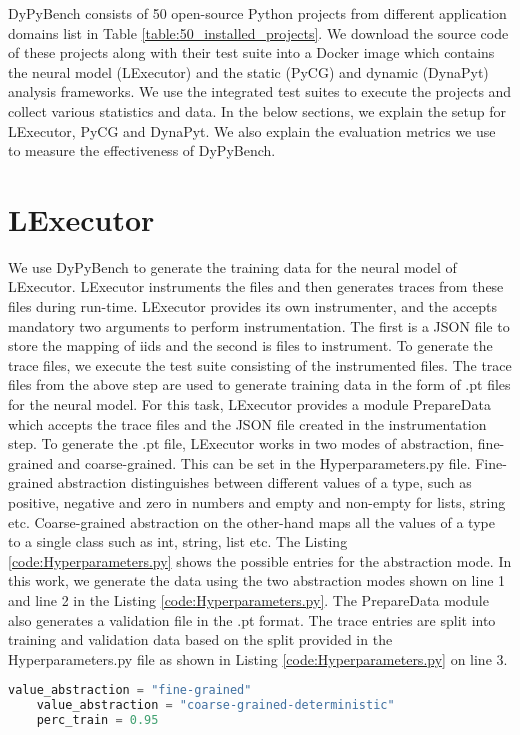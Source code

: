DyPyBench consists of 50 open-source Python projects from different application domains list in Table \ref{table:50_installed_projects}.
We download the source code of these projects along with their test suite into a Docker image which contains the neural model (LExecutor) and the static (PyCG) and dynamic (DynaPyt) analysis frameworks.
We use the integrated test suites to execute the projects and collect various statistics and data.
In the below sections, we explain the setup for LExecutor, PyCG and DynaPyt.
We also explain the evaluation metrics we use to measure the effectiveness of DyPyBench.

\section{LExecutor}
We use DyPyBench to generate the training data for the neural model of LExecutor.
LExecutor instruments the files and then generates traces from these files during run-time.
LExecutor provides its own instrumenter, and the accepts mandatory two arguments to perform instrumentation.
The first is a JSON file to store the mapping of iids and the second is files to instrument.
To generate the trace files, we execute the test suite consisting of the instrumented files.
The trace files from the above step are used to generate training data in the form of .pt files for the neural model.
For this task, LExecutor provides a module PrepareData which accepts the trace files and the JSON file created in the instrumentation step.
To generate the .pt file, LExecutor works in two modes of abstraction, fine-grained and coarse-grained.
This can be set in the Hyperparameters.py file.
Fine-grained abstraction distinguishes between different values of a type, such as positive, negative and zero in numbers and empty and non-empty for lists, string etc.
Coarse-grained abstraction on the other-hand maps all the values of a type to a single class such as int, string, list etc. \cite{LExecutor_2023}
The Listing \ref{code:Hyperparameters.py} shows the possible entries for the abstraction mode.
In this work, we generate the data using the two abstraction modes shown on line 1 and line 2 in the Listing \ref{code:Hyperparameters.py}. 
The PrepareData module also generates a validation file in the .pt format.
The trace entries are split into training and validation data based on the split provided in the Hyperparameters.py file as shown in Listing \ref{code:Hyperparameters.py} on line 3.
\begin{lstlisting}[caption=Abstraction Modes in LExecutor.,label=code:Hyperparameters.py,language=Python]
    value_abstraction = "fine-grained"
    value_abstraction = "coarse-grained-deterministic"
    perc_train = 0.95
\end{lstlisting}

